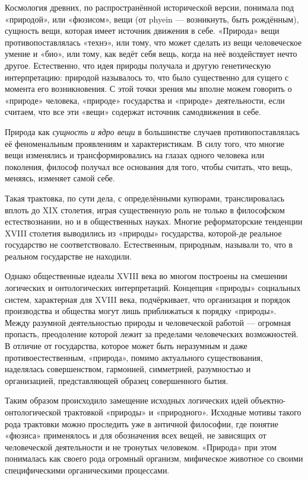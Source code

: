 \documentclass[11pt,a4paper]{article}
\begin{document}
Космология древних, по распространённой исторической версии, понимала под
«природой», или «фюзисом», вещи (от phyein — возникнуть, быть рождённым),
сущность вещи, которая имеет источник движения в себе. «Природа» вещи
противопоставлялась «технэ», или тому, что может сделать из вещи человеческое
умение и «био», или тому, как ведёт себя вещь, когда на неё воздействует нечто
другое. Естественно, что идея природы получала и другую генетическую
интерпретацию: природой называлось то, что было существенно для сущего с
момента его возникновения. С этой точки зрения мы вполне можем говорить о
«природе» человека, «природе» государства и «природе» деятельности, если
считаем, что все эти «вещи» содержат источник самодвижения в себе. 

Природа как \emph{сущность и ядро вещи} в большинстве случаев
противопоставлялась её феноменальным проявлениям и характеристикам. В силу
того, что многие вещи изменялись и трансформировались на глазах одного
человека или поколения, философ получал все основания для того, чтобы считать,
что вещь, меняясь, изменяет самой себе.

Такая трактовка, по сути дела, с определёнными купюрами, транслировалась
вплоть до XIX столетия, играя существенную роль не только в философском
естествознании, но и в общественных науках. Многие реформаторские тенденции
XVIII столетия выводились из «природы» государства, которой-де реальное
государство не соответствовало. Естественным, природным, называли то, что в
реальном государстве не находили. 

Однако общественные идеалы XVIII века во многом построены на смешении
логических и онтологических интерпретаций. Концепция «природы» социальных
систем, характерная для XVIII века, подчёркивает, что организация и порядок
производства и общества могут лишь приближаться к порядку «природы». Между
разумной деятельностью природы и человеческой работой — огромная пропасть,
преодоление которой лежит за пределами человеческих возможностей. В отличие от
государства, которое может быть неразумным и даже противоестественным,
«природа», помимо актуального существования, наделялась совершенством,
гармонией, симметрией, разумностью и организацией, представляющей образец
совершенного бытия. 

Таким образом происходило замещение исходных логических идей
объектно-онтологи\-ческой трактовкой «природы» и «природного». Исходные мотивы
такого рода трактовки можно проследить уже в античной философии, где понятие
«фюзиса» применялось и для обозначения всех вещей, не зависящих от
человеческой деятельности и не тронутых человеком. «Природа» при этом
понималась как своего рода огромный организм, мифическое животное со своими
специфическими органическими процессами. 
\end{document}
